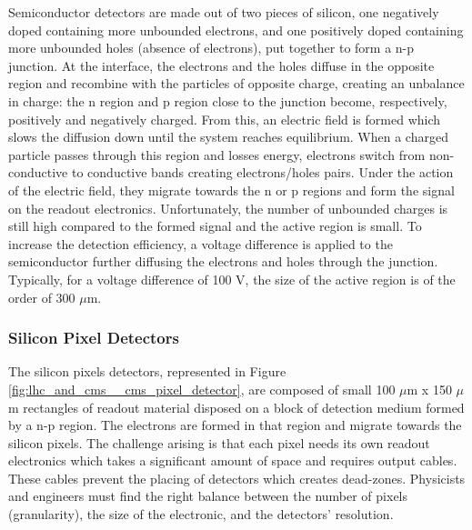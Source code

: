   \newcommand{\GeVc}{GeV c$ ^{-1} $}
  \newcommand{\um}{$ \mu $m}
  \newcommand{\us}{$ \mu $s}
  \newcommand{\pT}{$ p_T $}
  \newcommand{\pZ}{$ p_Z $}
  \newcommand{\axis}[1]{#1}



  Semiconductor detectors are made out of two pieces of silicon, one negatively doped containing more unbounded electrons, and one positively doped containing more unbounded holes (absence of electrons), put together to form a n-p junction. At the interface, the electrons and the holes diffuse in the opposite region and recombine with the particles of opposite charge, creating an unbalance in charge: the n region and p region close to the junction become, respectively, positively and negatively charged. From this, an electric field is formed which slows the diffusion down until the system reaches equilibrium. When a charged particle passes through this region and losses energy, electrons switch from non-conductive to conductive bands creating electrons/holes pairs. Under the action of the electric field, they migrate towards the n or p regions and form the signal on the readout electronics. Unfortunately, the number of unbounded charges is still high compared to the formed signal and the active region is small. To increase the detection efficiency, a voltage difference is applied to the semiconductor further diffusing the electrons and holes through the junction. Typically, for a voltage difference of 100 V, the size of the active region is of the order of 300 \um{}.

  \subsubsection{Silicon Pixel Detectors}
  \label{sec:lhc_and_cms__silicon_pixel_detectors}

    The silicon pixels detectors, represented in Figure \ref{fig:lhc_and_cms__cms_pixel_detector}, are composed of small 100 \um{} x 150 \um{} rectangles of readout material disposed on a block of detection medium formed by a n-p region. The electrons are formed in that region and migrate towards the silicon pixels. The challenge arising is that each pixel needs its own readout electronics which takes a significant amount of space and requires output cables. These cables prevent the placing of detectors which creates dead-zones. Physicists and engineers must find the right balance between the number of pixels (granularity), the size of the electronic, and the detectors' resolution. \\

